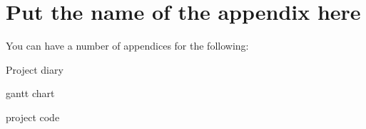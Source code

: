 \chapter{Put the name of the appendix here }

You can have a number of appendices for the following:


Project diary

gantt chart 

project code 